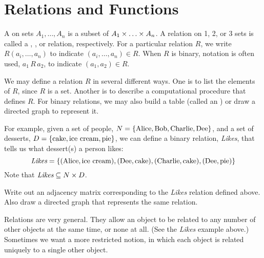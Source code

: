 \section{Relations and Functions}

\begin{defn}[Relations]
A  on sets $A_1, \ldots, A_n$ is a subset of $A_1 \times \ldots \times A_n$. A relation on 1, 2, or 3 sets is called a , , or  relation, respectively. For a particular relation $R$, we  write $R(a_i, \ldots, a_n)$ to indicate $(a_i, \ldots, a_n) \in R$. When $R$ is binary,  notation is often used, $a_1\,R\,a_2$, to indicate $(a_1, a_2) \in R$.

We may define a relation $R$ in several different ways. One is to list the elements of $R$, since $R$ is a set. Another is to describe a computational procedure that defines $R$. For binary relations, we may also build a table (called an ) or draw a directed graph to represent it.
\end{defn}

\begin{discussion}
For example, given a set of people, $N = \left\lbrace \textrm{Alice}, \textrm{Bob}, \textrm{Charlie}, \textrm{Dee} \right\rbrace$, and a set of desserts, $D = \left\lbrace \textrm{cake}, \textrm{ice cream}, \textrm{pie} \right\rbrace$, we can define a binary relation, \textit{Likes}, that tells us what dessert(s) a person likes: 
\[
	\textit{Likes} = \left\lbrace  (\textrm{Alice}, \textrm{ice cream}), 
					   (\textrm{Dee}, \textrm{cake}),
					   (\textrm{Charlie}, \textrm{cake}),
					   (\textrm{Dee}, \textrm{pie})  \right\rbrace \]
Note that $\textit{Likes} \subseteq N \times D$.
\end{discussion}

\begin{exer}
Write out an adjacency matrix corresponding to the \textit{Likes} relation defined above. Also draw a directed graph that represents the same relation.
\end{exer}

\begin{discussion}
Relations are very general. They allow an object to be related to any number of other objects at the same time, or none at all. (See the \textit{Likes} example above.) Sometimes we want a more restricted notion, in which each object is related uniquely to a single other object.
\end{discussion}


